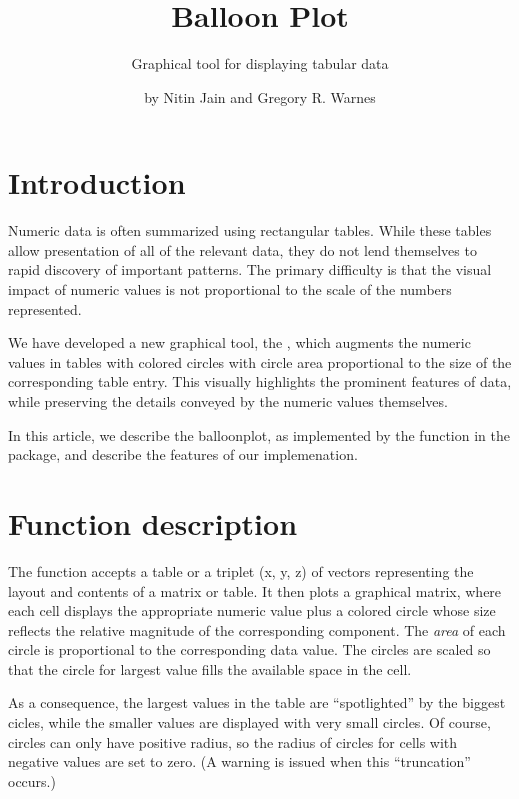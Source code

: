\documentclass[a4paper]{report}
\begin{document}
\begin{article}
\author{by Nitin Jain and Gregory R. Warnes}
\title{Balloon Plot}
\subtitle{Graphical tool for displaying tabular data}

\maketitle

\section*{Introduction}

Numeric data is often summarized using rectangular tables. While
these tables allow presentation of all of the relevant data, they do
not lend themselves to rapid discovery of important patterns. The
primary difficulty is that the visual impact of numeric values is
not proportional to the scale of the numbers represented.

We have developed a new graphical tool, the ,
which augments the numeric values in tables with colored circles
with circle area proportional to the size of the corresponding table
entry. This visually highlights the prominent features of
data, while preserving the details conveyed by the numeric values
themselves.

In this article, we describe the balloonplot, as
implemented by the  function in the
 package, and describe the features of our
implemenation.


\section*{Function description}

The function  accepts a table or a triplet (x,
y, z) of vectors representing the layout and contents of a matrix or
table.  It then plots a graphical matrix, where each cell displays
the appropriate numeric value plus a colored circle whose size
reflects the relative magnitude of the corresponding component. The
\emph{area} of each circle is proportional to the corresponding data
value. The circles are scaled so that the circle for largest value
fills the available space in the cell.

As a consequence, the largest values in the table are ``spotlighted''
by the biggest cicles, while the smaller values are displayed
with very small circles.  Of course, circles can only have positive
radius, so the radius of circles for cells with negative values are
set to zero.  (A warning is issued when this ``truncation'' occurs.)


\end{article}
\end{document}
